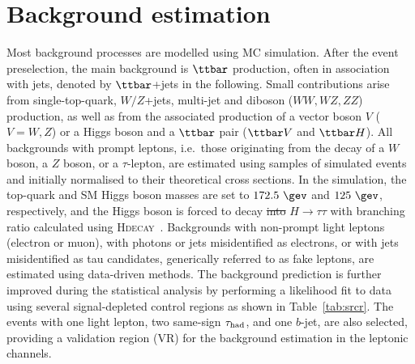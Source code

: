 \documentclass[PAPER, coverpage, atlasdraft=true, texlive=2016, UKenglish]{\ATLASLATEXPATH atlasdoc}
\providecommand{\DIFadd}[1]{{\protect\color{blue}\uwave{#1}}} %
\providecommand{\DIFdel}[1]{{\protect\color{red}\sout{#1}}}                      %
\providecommand{\DIFaddbegin}{} %
\providecommand{\DIFaddend}{} %
\providecommand{\DIFdelbegin}{} %
\providecommand{\DIFdelend}{} %
\begin{document}

\FloatBarrier

\section{Background estimation}
\label{sec:background_model}

Most background processes are modelled using MC simulation.
After the event preselection, the main background is $\ttbar$ production, often in association with jets, denoted by $\ttbar$+jets in the following.
Small contributions arise from single-top-quark, $W/Z$+jets, multi-jet and diboson ($WW,WZ,ZZ$) production, as well as from the associated 
production of a vector boson $V$ ($V=W,Z$) or a Higgs boson and a $\ttbar$ pair ($\ttbar V$ and $\ttbar H$). All backgrounds 
with prompt leptons, i.e.\ those originating from the decay of a $W$ boson, a $Z$ boson, or a $\tau$-lepton,
are estimated using samples of simulated events and \DIFaddbegin \DIFadd{are }\DIFaddend initially normalised to their theoretical cross sections.
In the simulation, the top-quark and SM Higgs boson masses are set to $172.5~\gev$ and $125~\gev$, respectively,
and the Higgs boson is forced to decay \DIFdelbegin \DIFdel{into }\DIFdelend \DIFaddbegin \DIFadd{via }\DIFaddend $H\to \tau\tau$ with branching ratio calculated using \textsc{Hdecay}~\cite{Djouadi:1997yw}.  
Backgrounds with non-prompt light leptons (electron or muon), with photons or jets misidentified as electrons, or with jets misidentified as tau candidates, 
generically referred to as fake leptons, are estimated using data-driven methods. 
The background prediction is further improved during the statistical analysis by performing a likelihood 
fit to data using several signal-depleted control regions as shown in Table~\ref{tab:srcr}.
The events with one light lepton, two same-sign $\tau_{\mathrm{had}}$, and one $b$-jet, are also selected, providing a validation region (VR) for the background estimation in the leptonic channels. 
\end{document}
